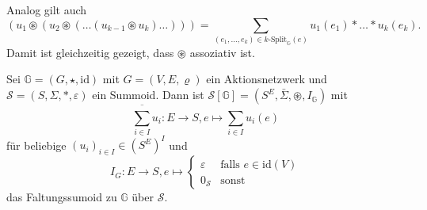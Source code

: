 \documentclass{article}
\begin{document}
\begin{remark}
  Analog gilt auch
  \begin{equation*}
    (u_1 \circledast (u_2 \circledast (\dots (u_{k - 1} \circledast u_k) \dots ))) = \sum_{(e_1, \dots, e_k) \in k\text{-Split}_\mathbb{G}(e)}u_1(e_1) \ast \dots \ast u_k(e_k).
  \end{equation*}
  Damit ist gleichzeitig gezeigt, dass $\circledast$ assoziativ ist.
\end{remark}

\begin{definition}
  Sei $\mathbb{G} = (G, \star, \text{id})$ mit $G = (V, E, \varrho)$ ein Aktionsnetzwerk
  und $\mathcal{S} = (S, \Sigma, \ast, \varepsilon)$ ein Summoid.
  Dann ist $\mathcal{S}[\mathbb{G}] = (S^E, \bar\Sigma, \circledast, I_\mathbb{G})$ mit
  \begin{equation*}
    \overline{\sum_{i \in I}} u_i \colon E \to S, e \mapsto \sum_{i \in I}u_i(e)
  \end{equation*}
  für beliebige $(u_i)_{i \in I} \in (S^E)^I$
  und
  \begin{equation*}
    I_G \colon E \to S, e \mapsto
    \begin{cases}
      \varepsilon & \text{falls } e \in \text{id}(V) \\
      0_\mathcal{S} & \text{sonst}
    \end{cases}
  \end{equation*} 
  das Faltungssumoid zu $\mathbb{G}$ über $\mathcal{S}$.
\end{definition}
\end{document}
